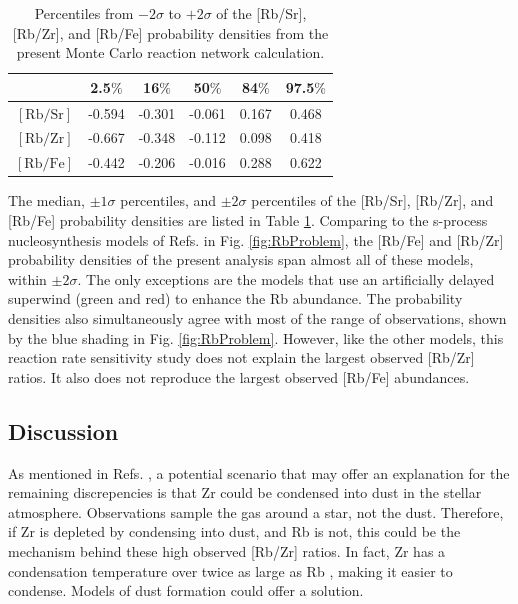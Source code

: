 \begin{table}[t]
\centering
\caption{\label{tab:Prob_Dens}Percentiles from $-2\sigma$ to $+2\sigma$ of the [Rb/Sr], [Rb/Zr], and [Rb/Fe] probability densities from the present Monte Carlo reaction network calculation.}
\begin{tabular}{cccccc}
\hline\midrule
{}&2.5$\%$&16$\%$&50$\%$&84$\%$&97.5$\%$\\ \midrule
$[\mathrm{Rb}/\mathrm{Sr}]$&-0.594&-0.301&-0.061&0.167&0.468\\
$[\mathrm{Rb}/\mathrm{Zr}]$&-0.667&-0.348&-0.112&0.098&0.418\\
$[\mathrm{Rb}/\mathrm{Fe}]$&-0.442&-0.206&-0.016&0.288&0.622\\
\hline\hline
\end{tabular}
\end{table}

The median, $\pm 1\sigma$ percentiles, and $\pm 2\sigma$ percentiles of the [Rb/Sr], [Rb/Zr], and [Rb/Fe] probability densities are listed in Table \ref{tab:Prob_Dens}. Comparing to the s-process nucleosynthesis models of Refs. \cite{Karakas2012,Raai2012,Karakas2016,Pignatari2016} in Fig. \ref{fig:RbProblem}, the [Rb/Fe] and [Rb/Zr] probability densities of the present analysis span almost all of these models, within $\pm 2\sigma$. The only exceptions are the models that use an artificially delayed superwind (green and red) to enhance the Rb abundance. The probability densities also simultaneously agree with most of the range of observations, shown by the blue shading in Fig. \ref{fig:RbProblem}. However, like the other models, this reaction rate sensitivity study does not explain the largest observed [Rb/Zr] ratios. It also does not reproduce the largest observed [Rb/Fe] abundances.

\subsection{Discussion}

As mentioned in Refs. \cite{Raai2012,Perez2017}, a potential scenario that may offer an explanation for the remaining discrepencies is that Zr could be condensed into dust in the stellar atmosphere. Observations sample the gas around a star, not the dust. Therefore, if Zr is depleted by condensing into dust, and Rb is not, this could be the mechanism behind these high observed [Rb/Zr] ratios. In fact, Zr has a condensation temperature over twice as large as Rb \cite{Raai2012}, making it easier to condense. Models of dust formation could offer a solution.

